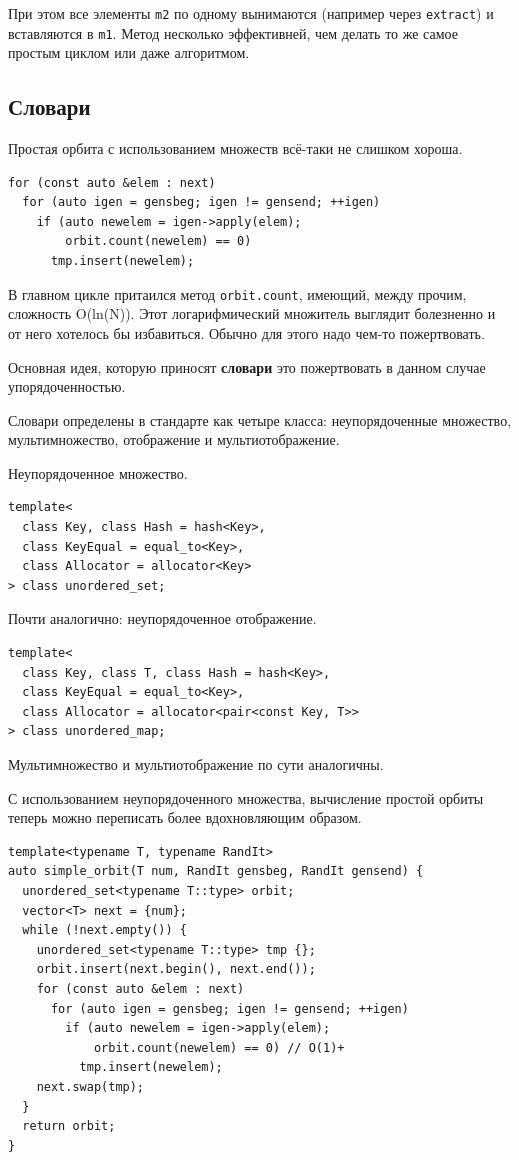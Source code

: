 \documentclass[a4paper,12pt,oneside]{book}
\begin{document}
При этом все элементы \lstinline!m2! по одному вынимаются (например через \lstinline!extract!) и вставляются в \lstinline!m1!. Метод несколько эффективней, чем делать то же самое простым циклом или даже алгоритмом.

\subsection{Словари}

Простая орбита с использованием множеств всё-таки не слишком хороша.

\begin{lstlisting}
for (const auto &elem : next)
  for (auto igen = gensbeg; igen != gensend; ++igen)
    if (auto newelem = igen->apply(elem); 
        orbit.count(newelem) == 0)
      tmp.insert(newelem);
\end{lstlisting}

В главном цикле притаился метод \lstinline!orbit.count!, имеющий, между прочим, сложность O(ln(N)). Этот логарифмический множитель выглядит болезненно и от него хотелось бы избавиться. Обычно для этого надо чем-то пожертвовать.

Основная идея, которую приносят \textbf{словари} это пожертвовать в данном случае упорядоченностью.

Словари определены в стандарте как четыре класса: неупорядоченные множество, мультимножество, отображение и мультиотображение.

Неупорядоченное множество.

\begin{lstlisting}
template<
  class Key, class Hash = hash<Key>, 
  class KeyEqual = equal_to<Key>,
  class Allocator = allocator<Key>
> class unordered_set;
\end{lstlisting}

Почти аналогично: неупорядоченное отображение.

\begin{lstlisting}
template<
  class Key, class T, class Hash = hash<Key>,
  class KeyEqual = equal_to<Key>,
  class Allocator = allocator<pair<const Key, T>>
> class unordered_map;
\end{lstlisting}

Мультимножество и мультиотображение по сути аналогичны.

С использованием неупорядоченного множества, вычисление простой орбиты теперь можно переписать более вдохновляющим образом.

\begin{lstlisting}
template<typename T, typename RandIt>
auto simple_orbit(T num, RandIt gensbeg, RandIt gensend) {
  unordered_set<typename T::type> orbit;
  vector<T> next = {num};
  while (!next.empty()) {
    unordered_set<typename T::type> tmp {};
    orbit.insert(next.begin(), next.end());
    for (const auto &elem : next)
      for (auto igen = gensbeg; igen != gensend; ++igen)
        if (auto newelem = igen->apply(elem); 
            orbit.count(newelem) == 0) // O(1)+
          tmp.insert(newelem);
    next.swap(tmp);
  }
  return orbit;
}
\end{lstlisting}
\end{document}
